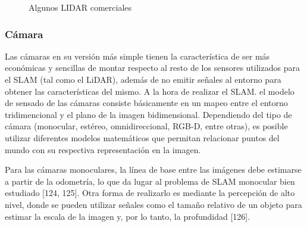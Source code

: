 \begin{figure}
    \centering
    \qquad
    \caption{Algunos LIDAR comerciales}
    \label{fig:lidars}
\end{figure}

\subsubsection{Cámara}
Las cámaras en su versión más simple tienen la característica de ser más económicas y sencillas de montar respecto al resto de los sensores utilizados para el SLAM (tal como el LiDAR), además de no emitir señales al entorno para obtener las características del mismo. A la hora de realizar el SLAM. el modelo de sensado de las cámaras consiste básicamente en un mapeo entre el entorno tridimencional y el plano de la imagen bidimensional. Dependiendo del tipo de cámara (monocular, estéreo, omnidireccional, RGB-D, entre otras), es posible utilizar diferentes modelos matemáticos que permitan relacionar puntos del mundo con su respectiva representación en la imagen.

Para las cámaras monoculares, la línea de base entre las imágenes debe estimarse a partir de la odometría, lo que da lugar al problema de SLAM monocular bien estudiado [124, 125]. Otra forma de realizarlo es mediante la percepción de alto nivel, donde se pueden utilizar señales como el tamaño relativo de un objeto para estimar la escala de la imagen y, por lo tanto, la profundidad [126].

